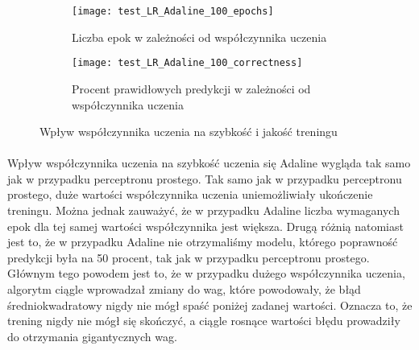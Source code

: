 \documentclass[\main/main.tex]{subfiles}
\begin{document}
    \begin{figure}[H]
    \centering
    \begin{subfigure}{.5\textwidth}
    \centering
    \texttt{[image: test\_LR\_Adaline\_100\_epochs]}
    \caption{Liczba epok w zależności od współczynnika uczenia}
    \label{fig:lr_sp_epochs}
    \end{subfigure}%
    \begin{subfigure}{.5\textwidth}
    \centering
    \texttt{[image: test\_LR\_Adaline\_100\_correctness]}
    \caption{Procent prawidłowych predykcji w zależności od współczynnika uczenia}
    \label{fig:lr_sp_correctness}
    \end{subfigure}
    \caption{Wpływ współczynnika uczenia na szybkość i jakość treningu}
    \label{fig:test}
    \end{figure}
    
    \paragraph{}
    Wpływ współczynnika uczenia na szybkość uczenia się Adaline wygląda tak samo jak w przypadku perceptronu prostego. Tak samo jak w przypadku perceptronu prostego, duże wartości współczynnika uczenia uniemożliwiały ukończenie treningu. Można jednak zauważyć, że w przypadku Adaline liczba wymaganych epok dla tej samej wartości współczynnika jest większa. Drugą różnią natomiast jest to, że w przypadku Adaline nie otrzymaliśmy modelu, którego poprawność predykcji była na 50 procent, tak jak w przypadku perceptronu prostego. Głównym tego powodem jest to, że w przypadku dużego współczynnika uczenia, algorytm ciągle wprowadzał zmiany do wag, które powodowały, że błąd średniokwadratowy nigdy nie mógł spaść poniżej zadanej wartości. Oznacza to, że trening nigdy nie mógł się skończyć, a ciągle rosnące wartości błędu prowadziły do otrzymania gigantycznych wag.
    
\end{document}
